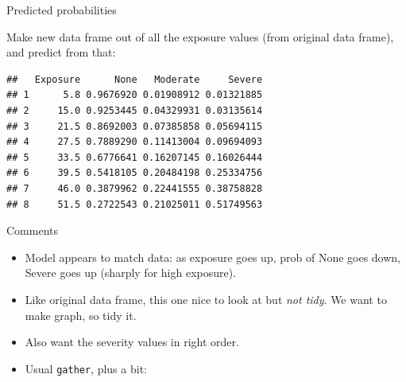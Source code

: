 \documentclass[ignorenonframetext,]{beamer}
\newenvironment{Shaded}{\begin{snugshade}}{\end{snugshade}}
\newcommand{\DataTypeTok}[1]{\textcolor[rgb]{0.13,0.29,0.53}{#1}}
\newcommand{\FloatTok}[1]{\textcolor[rgb]{0.00,0.00,0.81}{#1}}
\newcommand{\KeywordTok}[1]{\textcolor[rgb]{0.13,0.29,0.53}{\textbf{#1}}}
\newcommand{\NormalTok}[1]{#1}
\newcommand{\OperatorTok}[1]{\textcolor[rgb]{0.81,0.36,0.00}{\textbf{#1}}}
\newcommand{\StringTok}[1]{\textcolor[rgb]{0.31,0.60,0.02}{#1}}
\begin{document}
\begin{frame}[fragile]{Predicted probabilities}
\protect\hypertarget{predicted-probabilities}{}

Make new data frame out of all the exposure values (from original data
frame), and predict from that:

\begin{Shaded}
\end{Shaded}

\begin{verbatim}
##   Exposure      None   Moderate     Severe
## 1      5.8 0.9676920 0.01908912 0.01321885
## 2     15.0 0.9253445 0.04329931 0.03135614
## 3     21.5 0.8692003 0.07385858 0.05694115
## 4     27.5 0.7889290 0.11413004 0.09694093
## 5     33.5 0.6776641 0.16207145 0.16026444
## 6     39.5 0.5418105 0.20484198 0.25334756
## 7     46.0 0.3879962 0.22441555 0.38758828
## 8     51.5 0.2722543 0.21025011 0.51749563
\end{verbatim}

\end{frame}

\begin{frame}[fragile]{Comments}
\protect\hypertarget{comments-15}{}

\begin{itemize}
\item
  Model appears to match data: as exposure goes up, prob of None goes
  down, Severe goes up (sharply for high exposure).
\item
  Like original data frame, this one nice to look at but \emph{not
  tidy}. We want to make graph, so tidy it.
\item
  Also want the severity values in right order.
\item
  Usual \texttt{gather}, plus a bit:
\end{itemize}

\begin{Shaded}
\end{Shaded}

\end{frame}
\end{document}
